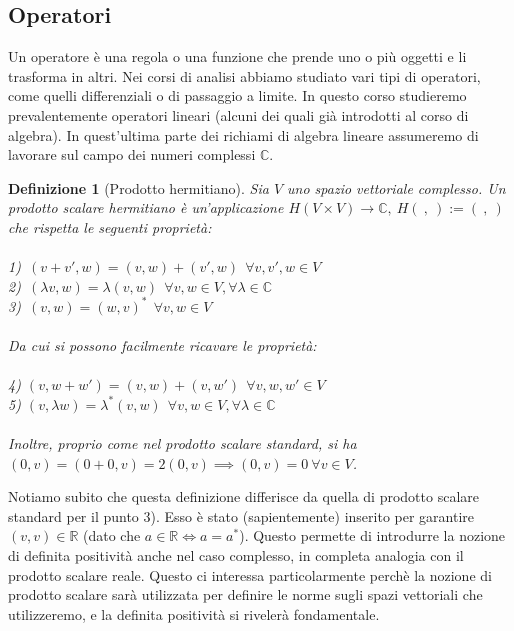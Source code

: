 \documentclass[a4paper,12pt]{report}
\newtheorem{definizione}{Definizione}[chapter]
\begin{document}
\newpage

\subsection{Operatori}\label{sec: 1.1.5}

Un operatore è una regola o una funzione che prende uno o più oggetti e li trasforma in altri. Nei corsi di analisi abbiamo studiato vari tipi di operatori, come quelli differenziali o di passaggio a limite. In questo corso studieremo prevalentemente operatori lineari (alcuni dei quali già introdotti al corso di algebra).
In quest'ultima parte dei richiami di algebra lineare assumeremo di lavorare sul campo dei numeri complessi $\mathbb{C}$. 

\begin{definizione}[Prodotto hermitiano]\label{def: 1.22}
    Sia $V$ uno spazio vettoriale complesso. Un prodotto scalare hermitiano è un'applicazione $H(V \times V) \to \mathbb{C}, \ H( \ ,\ ):=(\ ,\ )$ che rispetta le seguenti proprietà:
    \\
    \\ 1)\ $(v+v',w)=(v,w)+(v',w) \ \ \forall v,v',w\in V$
    \\ 2)\ $(\lambda v,w)=\lambda (v,w) \ \ \forall v,w \in V, \forall\lambda \in \mathbb{C}$
    \\ 3)\ $(v,w)=(w,v)^* \ \ \forall v,w \in V$
    \\
    \\ Da cui si possono facilmente ricavare le proprietà:
    \\
    \\ 4) $(v,w+w')=(v,w)+(v,w') \ \ \forall v,w,w' \in V$
    \\ 5) $(v,\lambda w)=\lambda^*(v,w) \ \ \forall v,w \in V, \forall\lambda \in \mathbb{C}$
    \\
    \\Inoltre, proprio come nel prodotto scalare standard, si ha $(0,v)=(0+0,v)=2(0,v) \implies(0,v)=0 \ \forall v \in V$.
\end{definizione}

Notiamo subito che questa definizione differisce da quella di prodotto scalare standard per il punto 3). Esso è stato (sapientemente) inserito per garantire $(v,v) \in \mathbb{R}$ (dato che $a \in \mathbb{R} \iff a=a^*$). Questo permette di introdurre la nozione di definita positività anche nel caso complesso, in completa analogia con il prodotto scalare reale. Questo ci interessa particolarmente perchè la nozione di prodotto scalare sarà utilizzata per definire le norme sugli spazi vettoriali che utilizzeremo, e la definita positività si rivelerà fondamentale. 
\end{document}
